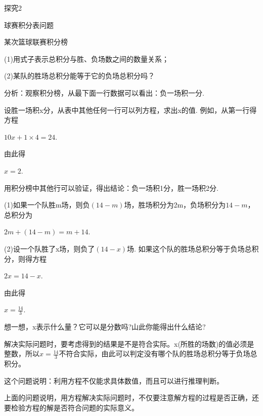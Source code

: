 \documentclass{article}
\begin{document}
\begin{example}
探究2\newline

球赛积分表问题\newline

某次篮球联赛积分榜\newline

(1)用式子表示总积分与胜、负场数之间的数量关系；\newline

(2)某队的胜场总积分能等于它的负场总积分吗？\newline

分析：观察积分榜，从最下面一行数据可以看出：负一场积一分. \newline

设胜一场积x分，从表中其他任何一行可以列方程，求出x的值. 例如，从第一行得方程\newline

$10x+1\times4=24$.\newline

由此得\newline

$x=2$.\newline

用积分榜中其他行可以验证，得出结论：负一场积1分，胜一场积2分.\newline

(1)如果一个队胜m场，则负$(14-m)$场，胜场积分为2m，负场积分为$14-m$，总积分为\newline

$2m+(14-m)=m+14$. \newline

(2)设一个队胜了x场，则负了$(14-x)$场. 如果这个队的胜场总积分等于负场总积分，则得方程\newline

$2x=14-x$. \newline

由此得\newline

$x=\frac{14}{3}$. \newline

想一想，x表示什么量？它可以是分数吗?山此你能得出什么结论?

解决实际问题时，要考虑得到的结果是不是符合实际。x(所胜的场数)的值必须是整数，所以$x=\frac{14}{3}$不符合实际，由此可以判定没有哪个队的胜场总积分等于负场总积分。

这个问题说明：利用方程不仅能求具体数值，而且可以进行推理判断。

上面的问题说明，用方程解决实际问题时，不仅要注意解方程的过程是否正确，还要检验方程的解是否符合问题的实际意义。




\end{example}
\end{document}
